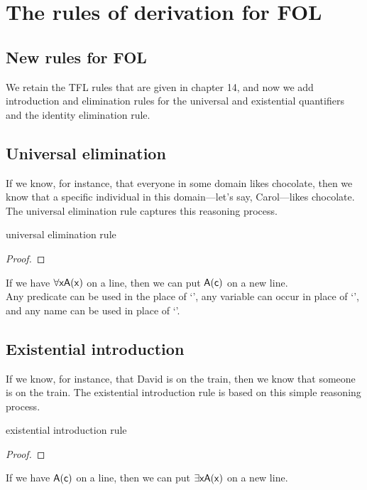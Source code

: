\graphicspath{{figures--FOL/}}

\chapter{The rules of derivation for FOL}\label{FOL-rules}

\section{New rules for FOL}

We retain the TFL rules that are given in chapter 14, and now we add introduction and elimination rules for the universal and existential quantifiers and the identity elimination rule.

\section{Universal elimination}

If we know, for instance, that everyone in some domain likes chocolate, then we know that a specific individual in this domain---let's say, Carol---likes chocolate. The universal elimination rule captures this reasoning process. 

\begin{factboxy}{universal elimination rule}
\begin{proof}
	 
\end{proof}

\small{If we have $\forall \mathsf{x A(x)}$ on a line, then we can put $\mathsf{A(c)}$ on a new line.\\ 
Any predicate can  be used in the place of `', any variable can occur in place of `', and any name can be used in place of `'.}
\end{factboxy}


\section{Existential introduction}

If we know, for instance, that David is on the train, then we know that someone is on the train. The existential introduction rule is based on this simple reasoning process.

\begin{factboxy}{existential introduction rule}
\begin{proof}
	 
\end{proof}

\small{If we have $\mathsf{A(c)}$ on a line, then we can put $\exists \mathsf{x A(x)}$ on a new line.}
\end{factboxy}

